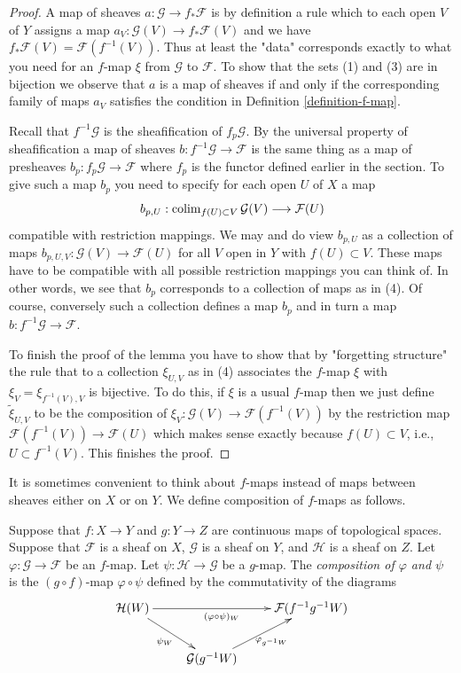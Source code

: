 \begin{proof}
A map of sheaves $a : \mathcal{G} \to f_*\mathcal{F}$
is by definition a rule which to each open $V$ of $Y$ assigns
a map $a_V : \mathcal{G}(V) \to f_*\mathcal{F}(V)$
and we have $f_*\mathcal{F}(V) = \mathcal{F}(f^{-1}(V))$.
Thus at least the "data" corresponds exactly to what you need
for an $f$-map $\xi$ from $\mathcal{G}$ to $\mathcal{F}$.
To show that the sets (1) and (3) are in bijection we observe that
$a$ is a map of sheaves if and only if the corresponding family of maps $a_V$
satisfies the condition in Definition \ref{definition-f-map}.

\medskip\noindent
Recall that $f^{-1}\mathcal{G}$ is the sheafification of $f_p\mathcal{G}$.
By the universal property of sheafification a map of sheaves
$b : f^{-1}\mathcal{G} \to \mathcal{F}$ is the same thing as a map of
presheaves $b_p : f_p\mathcal{G} \to \mathcal{F}$ where $f_p$ is the
functor defined earlier in the section. To give such a map $b_p$
you need to specify for each open $U$ of $X$ a map
$$
b_{p, U} :
\mathop{\mathrm{colim}}\nolimits_{f(U) \subset V} \mathcal{G}(V)
\longrightarrow
\mathcal{F}(U)
$$
compatible with restriction mappings. We may and do view $b_{p, U}$
as a collection of maps $b_{p, U, V} : \mathcal{G}(V) \to \mathcal{F}(U)$
for all $V$ open in $Y$ with $f(U) \subset V$. These maps have to be
compatible with all possible restriction mappings you can think of.
In other words, we see that $b_p$ corresponds to a collection of maps
as in (4). Of course, conversely such a collection defines a map
$b_p$ and in turn a map $b : f^{-1}\mathcal{G} \to \mathcal{F}$.

\medskip\noindent
To finish the proof of the lemma you have to show that by
"forgetting structure" the rule that to a collection $\xi_{U, V}$
as in (4) associates the $f$-map $\xi$ with $\xi_V = \xi_{f^{-1}(V), V}$
is bijective. To do this, if $\xi$ is a usual $f$-map then we just
define $\tilde \xi_{U, V}$ to be the composition of
$\xi_V : \mathcal{G}(V) \to \mathcal{F}(f^{-1}(V))$
by the restriction map $\mathcal{F}(f^{-1}(V)) \to \mathcal{F}(U)$
which makes sense exactly because $f(U) \subset V$, i.e.,
$U \subset f^{-1}(V)$. This finishes the proof.
\end{proof}

\noindent
It is sometimes convenient to think about $f$-maps
instead of maps between sheaves either on $X$ or on $Y$.
We define composition of $f$-maps as follows.

\begin{definition}
\label{definition-composition-f-maps}
Suppose that $f : X \to Y$ and $g : Y \to Z$ are continuous
maps of topological spaces. Suppose that $\mathcal{F}$ is
a sheaf on $X$, $\mathcal{G}$ is a sheaf on $Y$, and
$\mathcal{H}$ is a sheaf on $Z$.
Let $\varphi : \mathcal{G} \to \mathcal{F}$ be an $f$-map.
Let $\psi : \mathcal{H} \to \mathcal{G}$ be a $g$-map.
The {\it composition of $\varphi$ and $\psi$} is the
$(g \circ f)$-map $\varphi \circ \psi$ defined
by the commutativity of the diagrams
$$
\xymatrix{
\mathcal{H}(W) \ar[rr]_{(\varphi \circ \psi)_W}
\ar[rd]_{\psi_W} & &
\mathcal{F}(f^{-1}g^{-1}W) \\
&
\mathcal{G}(g^{-1}W)
\ar[ru]_{\varphi_{g^{-1}W}}
}
$$
\end{definition}


